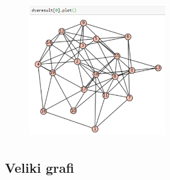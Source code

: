 \documentclass[a4paper]{article}
\begin{document}
\begin{figure}[h!]
    \centering
    \includegraphics[width=6cm, height=6cm]{Slika15}
    \label{fig:mesh1}
\end{figure}

\clearpage

\subsection{Veliki grafi}
\end{document}
